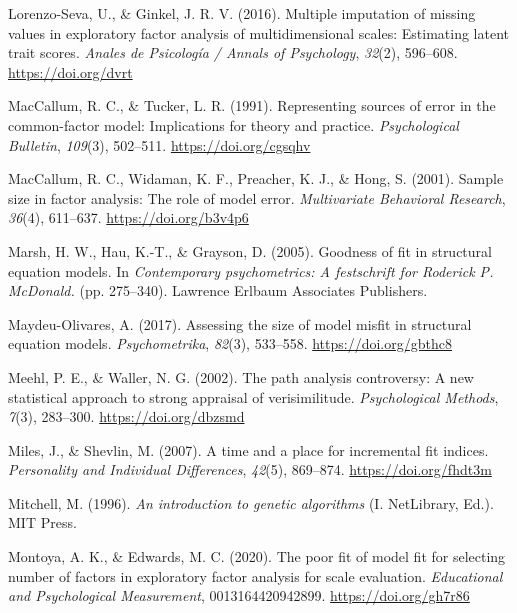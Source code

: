 \documentclass[11pt]{umnthesis}
\newlength{\cslhangindent}
\newenvironment{CSLReferences}[2] %
 {%
  \setlength{\parindent}{0pt}
  \ifodd #1 \everypar{\setlength{\hangindent}{\cslhangindent}}\ignorespaces\fi
  \ifnum #2 > 0
  \setlength{\parskip}{#2\baselineskip}
  \fi
 }%
 {}
\begin{document}
\begin{CSLReferences}{1}{0}
\leavevmode{}%
Lorenzo-Seva, U., \& Ginkel, J. R. V. (2016). Multiple imputation of missing values in exploratory factor analysis of multidimensional scales: Estimating latent trait scores. \emph{Anales de Psicología / Annals of Psychology}, \emph{32}(2), 596--608. \url{https://doi.org/dvrt}

\leavevmode{}%
MacCallum, R. C., \& Tucker, L. R. (1991). Representing sources of error in the common-factor model: {Implications} for theory and practice. \emph{Psychological Bulletin}, \emph{109}(3), 502--511. \url{https://doi.org/cgsqhv}

\leavevmode{}%
MacCallum, R. C., Widaman, K. F., Preacher, K. J., \& Hong, S. (2001). Sample size in factor analysis: {The} role of model error. \emph{Multivariate Behavioral Research}, \emph{36}(4), 611--637. \url{https://doi.org/b3v4p6}

\leavevmode{}%
Marsh, H. W., Hau, K.-T., \& Grayson, D. (2005). Goodness of fit in structural equation models. In \emph{Contemporary psychometrics: {A} festschrift for {Roderick P}. {McDonald}.} (pp. 275--340). {Lawrence Erlbaum Associates Publishers}.

\leavevmode{}%
Maydeu-Olivares, A. (2017). Assessing the size of model misfit in structural equation models. \emph{Psychometrika}, \emph{82}(3), 533--558. \url{https://doi.org/gbthc8}

\leavevmode{}%
Meehl, P. E., \& Waller, N. G. (2002). The path analysis controversy: {A} new statistical approach to strong appraisal of verisimilitude. \emph{Psychological Methods}, \emph{7}(3), 283--300. \url{https://doi.org/dbzsmd}

\leavevmode{}%
Miles, J., \& Shevlin, M. (2007). A time and a place for incremental fit indices. \emph{Personality and Individual Differences}, \emph{42}(5), 869--874. \url{https://doi.org/fhdt3m}

\leavevmode{}%
Mitchell, M. (1996). \emph{An introduction to genetic algorithms} (I. NetLibrary, Ed.). {MIT Press}.

\leavevmode{}%
Montoya, A. K., \& Edwards, M. C. (2020). The poor fit of model fit for selecting number of factors in exploratory factor analysis for scale evaluation. \emph{Educational and Psychological Measurement}, 0013164420942899. \url{https://doi.org/gh7r86}


\end{CSLReferences}
\end{document}
